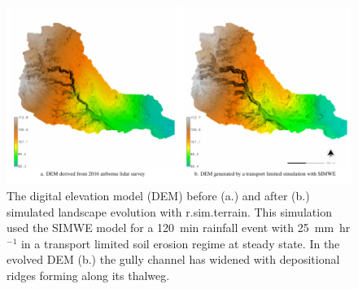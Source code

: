\documentclass[gmd, manuscript]{copernicus}
\begin{document}


\begin{figure}%
\center
\includegraphics[width=\textwidth,height=0.925\textheight,keepaspectratio]{figures/evolution.pdf}
\caption{
The digital elevation model (DEM) 
before (a.) and after (b.)
simulated landscape evolution with
r.sim.terrain. 
This simulation used the SIMWE model
for a 120~\unit{min} rainfall event with 25~\unit{mm~hr}$^{-1}$
in a transport limited soil erosion regime at steady state.
In the evolved DEM (b.)
the gully channel has widened 
with depositional ridges forming along its thalweg.}
\label{fig:evolution}
\end{figure}

\end{document}
